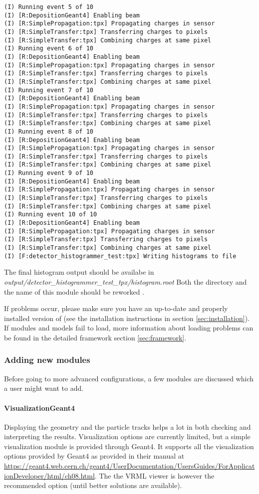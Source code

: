 \begin{lstlisting}[breaklines]
(I) Running event 5 of 10
(I) [R:DepositionGeant4] Enabling beam
(I) [R:SimplePropagation:tpx] Propagating charges in sensor
(I) [R:SimpleTransfer:tpx] Transferring charges to pixels
(I) [R:SimpleTransfer:tpx] Combining charges at same pixel
(I) Running event 6 of 10
(I) [R:DepositionGeant4] Enabling beam
(I) [R:SimplePropagation:tpx] Propagating charges in sensor
(I) [R:SimpleTransfer:tpx] Transferring charges to pixels
(I) [R:SimpleTransfer:tpx] Combining charges at same pixel
(I) Running event 7 of 10
(I) [R:DepositionGeant4] Enabling beam
(I) [R:SimplePropagation:tpx] Propagating charges in sensor
(I) [R:SimpleTransfer:tpx] Transferring charges to pixels
(I) [R:SimpleTransfer:tpx] Combining charges at same pixel
(I) Running event 8 of 10
(I) [R:DepositionGeant4] Enabling beam
(I) [R:SimplePropagation:tpx] Propagating charges in sensor
(I) [R:SimpleTransfer:tpx] Transferring charges to pixels
(I) [R:SimpleTransfer:tpx] Combining charges at same pixel
(I) Running event 9 of 10
(I) [R:DepositionGeant4] Enabling beam
(I) [R:SimplePropagation:tpx] Propagating charges in sensor
(I) [R:SimpleTransfer:tpx] Transferring charges to pixels
(I) [R:SimpleTransfer:tpx] Combining charges at same pixel
(I) Running event 10 of 10
(I) [R:DepositionGeant4] Enabling beam
(I) [R:SimplePropagation:tpx] Propagating charges in sensor
(I) [R:SimpleTransfer:tpx] Transferring charges to pixels
(I) [R:SimpleTransfer:tpx] Combining charges at same pixel
(I) [F:detector_histogrammer_test:tpx] Writing histograms to file
\end{lstlisting}
The final histogram output should be availabe in \\ \textit{output/detector\_histogrammer\_test\_tpx/histogram.root} \todo Both the directory and the name of this module should be reworked \todo.

If problems occur, please make sure you have an up-to-date and properly installed version of \apsq (see the installation instructions in section \ref{sec:installation}). If modules and models fail to load, more information about loading problems can be found in the detailed framework section \ref{sec:framework}.

\subsubsection{Adding new modules}
Before going to more advanced configurations, a few modules are discussed which a user might want to add.

\paragraph{VisualizationGeant4}
Displaying the geometry and the particle tracks helps a lot in both checking and interpreting the results. Visualization options are currently limited, but a simple visualization module is provided through Geant4. It supports all the visualization options provided by Geant4 as provided in their manual at \url{https://geant4.web.cern.ch/geant4/UserDocumentation/UsersGuides/ForApplicationDeveloper/html/ch08.html}. The the VRML viewer is however the recommended option (until better solutions are available). 

